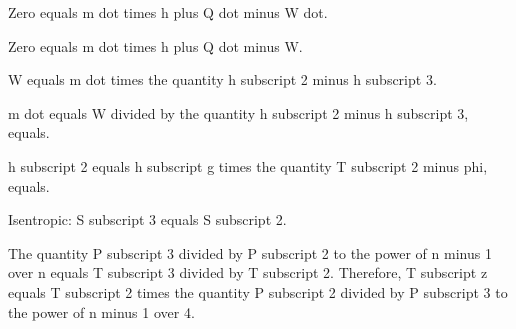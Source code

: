 Zero equals m dot times h plus Q dot minus W dot.

Zero equals m dot times h plus Q dot minus W.

W equals m dot times the quantity h subscript 2 minus h subscript 3.

m dot equals W divided by the quantity h subscript 2 minus h subscript 3, equals.

h subscript 2 equals h subscript g times the quantity T subscript 2 minus phi, equals.

Isentropic: S subscript 3 equals S subscript 2.

The quantity P subscript 3 divided by P subscript 2 to the power of n minus 1 over n equals T subscript 3 divided by T subscript 2. Therefore, T subscript z equals T subscript 2 times the quantity P subscript 2 divided by P subscript 3 to the power of n minus 1 over 4.